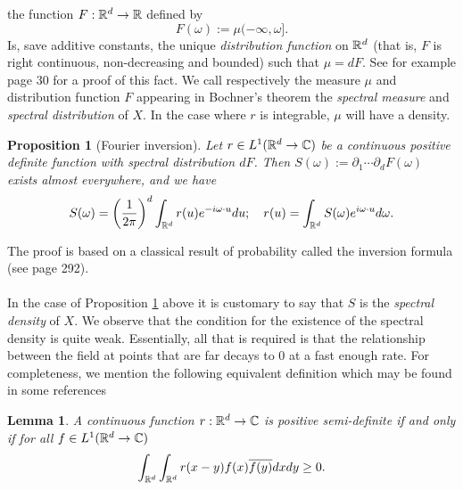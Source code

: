 \documentclass[12pt]{article}
\newtheorem{proposition}{Proposition}
\newtheorem{lemma}{Lemma}
\begin{document}
the function $F:{\mathbb R}^d\to {\mathbb R}$ defined by
\begin{equation*}
	F(\omega):= \mu (-\infty,\omega].
\end{equation*}
Is, save additive constants, the unique \emph{distribution function} on ${\mathbb R}^d$ (that is,  $F$ is right continuous, non-decreasing and bounded) such that $\mu =dF$. See for example \cite{ash2000probability} page $30$ for a proof of this fact. We call respectively the measure $\mu$ and distribution function $F$ appearing in Bochner's theorem  the \emph{spectral measure} and \emph{spectral distribution} of $X$. In the case where $r$ is integrable, $\mu$ will have a density.
\begin{proposition}[{Fourier inversion}]\label{Fourier inversion}
	Let $r\in L^1({\mathbb R}^d\to\mathbb{C})$ be a continuous positive definite function with spectral distribution $dF$. Then
	$S(\omega):=\partial_1\cdots\partial_d F(\omega)$ exists almost everywhere, and we have
	\begin{equation*}
		S(\omega)=\qty(\frac{1}{2\pi})^d\int_{{\mathbb R}^d} {r}(u)e^{-i\omega\cdot u} d u;\quad    r(u)=\int_{{\mathbb R}^d}S(\omega)e^{i \omega\cdot u} d\omega.
	\end{equation*}
\end{proposition}
The proof is based on a classical result of probability called the inversion formula (see \cite{ash2000probability} page 292).\\
\\
In the case of Proposition \ref{Fourier inversion} above it is customary to say that $S$ is the \emph{spectral density} of $X$. We observe that the condition for the existence of the spectral density is quite weak. Essentially, all that is required is that the relationship between the field at points that are far decays to $0$ at a fast enough rate. For completeness, we mention the following equivalent definition which may be found in some references
\begin{lemma}
	A continuous function $r:{\mathbb R}^d\to\mathbb{C}$ is positive semi-definite if and only if for all $f\in L^1({\mathbb R}^d\to\mathbb{C})$
	\begin{equation*}
		\int_{{\mathbb R}^d}\int_{{\mathbb R}^d} r(x-y)f(x)\overline{f(y)}dx dy \geq 0.
	\end{equation*}
\end{lemma}
\end{document}
